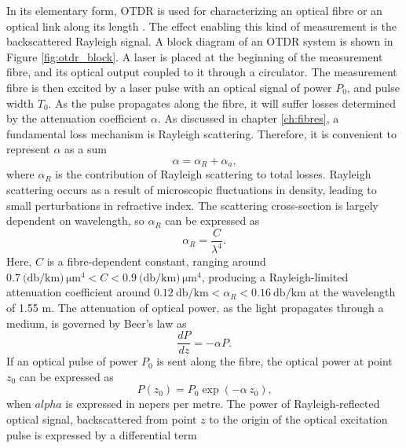 \documentclass{standalone}
\begin{document}
In its elementary form, OTDR is used for characterizing an optical fibre or an optical link along its length \cite{UnderstandingOTDRs2000}. The effect enabling this kind of measurement is the backscattered Rayleigh signal. A block diagram of an OTDR system is shown in Figure \ref{fig:otdr_block}.
A laser is placed at the beginning of the measurement fibre, and its optical output coupled to it through a circulator. The measurement fibre is then excited by a laser pulse with an optical signal of power $P_0$, and pulse width $T_0$. As the pulse propagates along the fibre, it will suffer losses determined by the attenuation coefficient $\alpha$. As discussed in chapter \ref{ch:fibres}, a fundamental loss mechanism is Rayleigh scattering. Therefore, it is convenient to represent $\alpha$ as a sum \cite{agrawal}
\begin{equation}
\alpha = \alpha_R + \alpha_a \textrm{,}
\end{equation}
where $\alpha_R$ is the contribution of Rayleigh scattering to total losses. Rayleigh scattering occurs as a result of microscopic fluctuations in density, leading to small perturbations in refractive index. The scattering cross-section is largely dependent on wavelength, so $\alpha_R$ can be expressed as
\begin{equation}
\alpha_R = \frac{C}{\lambda^4} \textrm{.}
\end{equation}
Here, $C$ is a fibre-dependent constant, ranging around $\SI{0.7}{(\decibel / \kilo \meter) \, \micro \meter ^4} < C < \SI{0.9}{(\decibel / \kilo \meter) \, \micro \meter ^4}$, producing a Rayleigh-limited attenuation coefficient around $\SI{0.12}{\decibel / \kilo \meter} < \alpha_R < \SI{0.16}{\decibel / \kilo \meter}$ at the wavelength of 1.55 \textmu m. The attenuation of optical power, as the light propagates through a medium, is governed by Beer's law as
\begin{equation}
\frac{dP}{dz} = -\alpha P \textrm{.}
\end{equation}
If an optical pulse of power $P_0$ is sent along the fibre, the optical power at point $z_0$ can be expressed as
\begin{equation}
P(z_0) = P_0 \exp\left(-\alpha \, z_0\right) \textrm{,}
\end{equation}
when $alpha$ is expressed in nepers per metre. The power of Rayleigh-reflected optical signal, backscattered from point $z$ to the origin of the optical excitation pulse is expressed by a differential term
\end{document}
